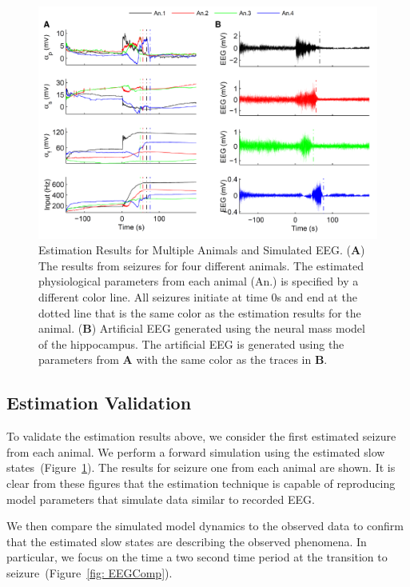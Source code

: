 \begin{figure}[ht]
 	\centering
 		\includegraphics{fig/AnimalComp.pdf}
 	\caption{Estimation Results for Multiple Animals and Simulated EEG. (\textbf{A}) The results from seizures for four different animals. The estimated physiological parameters from each animal (An.) is specified by a different color line. All seizures initiate at time 0s and end at the dotted line that is the same color as the estimation results for the animal. (\textbf{B}) Artificial EEG generated using the neural mass model of the hippocampus. The artificial EEG is generated using the parameters from \textbf{A} with the same color as the traces in \textbf{B}.}
 	\label{fig: SZComp}
 \end{figure}


\subsection{Estimation Validation}

To validate the estimation results above, we consider the first estimated seizure from each animal. We perform a forward simulation using the estimated slow states~(Figure~\ref{fig: SZComp}). The results for seizure one from each animal are shown. It is clear from these figures that the estimation technique is capable of reproducing model parameters that simulate data similar to recorded EEG.  

We then compare the simulated model dynamics to the observed data to confirm that the estimated slow states are describing the observed phenomena. In particular, we focus on the time a two second time period at the transition to seizure~(Figure~\ref{fig: EEGComp}).


